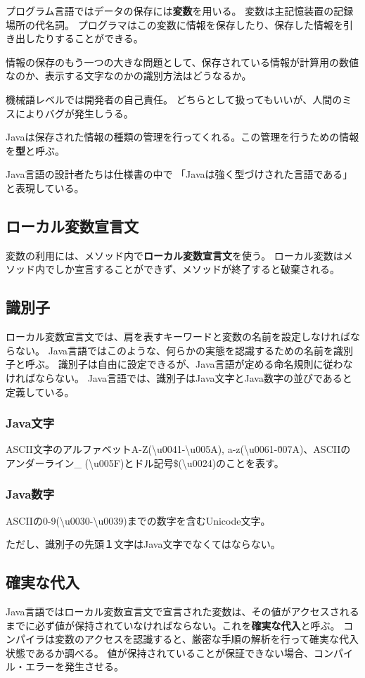 \documentclass[12pt,a4j,twoside]{jsbook}
\begin{document}
プログラム言語ではデータの保存には\textbf{変数}を用いる。
変数は主記憶装置の記録場所の代名詞。
プログラマはこの変数に情報を保存したり、保存した情報を引き出したりすることができる。

情報の保存のもう一つの大きな問題として、保存されている情報が計算用の数値なのか、表示する文字なのかの識別方法はどうなるか。

機械語レベルでは開発者の自己責任。
どちらとして扱ってもいいが、人間のミスによりバグが発生しうる。

Javaは保存された情報の種類の管理を行ってくれる。この管理を行うための情報を\textbf{型}と呼ぶ。

Java言語の設計者たちは仕様書の中で
「Javaは強く型づけされた言語である」と表現している。


\subsection{ローカル変数宣言文}
変数の利用には、メソッド内で\textbf{ローカル変数宣言文}を使う。
ローカル変数はメソッド内でしか宣言することができず、メソッドが終了すると破棄される。
\subsection{識別子}
ローカル変数宣言文では、肩を表すキーワードと変数の名前を設定しなければならない。
Java言語ではこのような、何らかの実態を認識するための名前を識別子と呼ぶ。
識別子は自由に設定できるが、Java言語が定める命名規則に従わなければならない。
Java言語では、識別子はJava文字とJava数字の並びであると定義している。
\subsubsection*{Java文字}
ASCII文字のアルファベットA-Z(\textbackslash u0041-\textbackslash u005A),
a-z(\textbackslash u0061-\u007A)、ASCIIのアンダーライン\_ (\textbackslash u005F)とドル記号\$(\textbackslash u0024)のことを表す。

\subsubsection*{Java数字}
ASCIIの0-9(\textbackslash u0030-\textbackslash u0039)までの数字を含むUnicode文字。

ただし、識別子の先頭１文字はJava文字でなくてはならない。
\subsection{確実な代入}
Java言語ではローカル変数宣言文で宣言された変数は、その値がアクセスされるまでに必ず値が保持されていなければならない。これを\textbf{確実な代入}と呼ぶ。
コンパイラは変数のアクセスを認識すると、厳密な手順の解析を行って確実な代入状態であるか調べる。
値が保持されていることが保証できない場合、コンパイル・エラーを発生させる。
\end{document}
